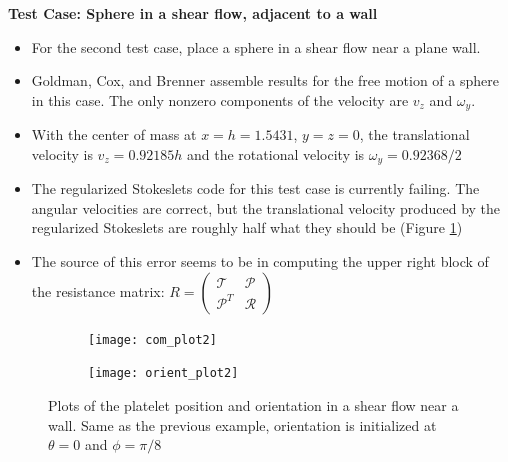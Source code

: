 \documentclass{article}
\begin{document}
\textbf{Test Case: Sphere in a shear flow, adjacent to a wall}
\begin{itemize}
\item For the second test case, place a sphere in a shear flow near a
  plane wall.
\item Goldman, Cox, and Brenner \cite{Goldman1967b} assemble results
  for the free motion of a sphere in this case. The only nonzero
  components of the velocity are $v_z$ and $\omega_y$.
\item With the center of mass at $x = h = 1.5431$, $y = z = 0$, the
  translational velocity is $v_z = 0.92185 h$ and the rotational
  velocity is $\omega_y = 0.92368 / 2$
\item The regularized Stokeslets code for this test case is currently
  failing. The angular velocities are correct, but the translational
  velocity produced by the regularized Stokeslets are roughly half
  what they should be (Figure \ref{fig:com_plot2})
\item The source of this error seems to be in computing the upper
  right block of the resistance matrix:
  $R =
  \begin{pmatrix}
    \mathcal{T} & \mathcal{P} \\
    \mathcal{P}^T & \mathcal{R}
  \end{pmatrix}$

\end{itemize}

\begin{figure}
  \centering
  \begin{subfigure}{0.49\textwidth}
    \texttt{[image: com\_plot2]}
  \end{subfigure}
  \hfill
  \begin{subfigure}{0.49\textwidth}
    \texttt{[image: orient\_plot2]}
  \end{subfigure}
  \caption{Plots of the platelet position and orientation in a shear
    flow near a wall. Same as the previous example, orientation is
    initialized at $\theta = 0$ and $\phi = \pi/8$}
  \label{fig:com_plot2}
\end{figure}



\end{document}
